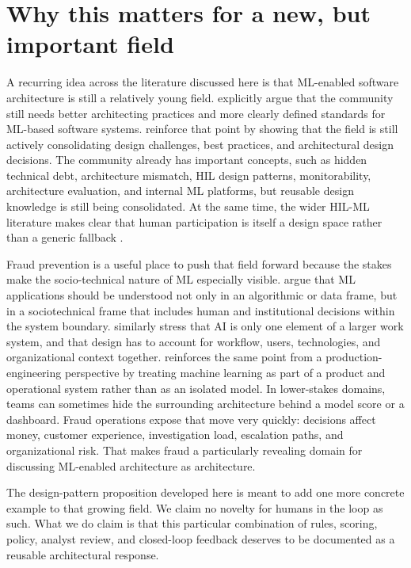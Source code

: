 \documentclass[11pt,a4paper]{article}
\begin{document}
\section{Why this matters for a new, but important field}

A recurring idea across the literature discussed here is that ML-enabled software architecture is still a relatively young field. \citet{Muccini2021} explicitly argue that the community still needs better architecting practices and more clearly defined standards for ML-based software systems. \citet{Nazir2024} reinforce that point by showing that the field is still actively consolidating design challenges, best practices, and architectural design decisions. The community already has important concepts, such as hidden technical debt, architecture mismatch, HIL design patterns, monitorability, architecture evaluation, and internal ML platforms, but reusable design knowledge is still being consolidated. At the same time, the wider HIL-ML literature makes clear that human participation is itself a design space rather than a generic fallback \citep{MosqueiraRey2023, Andersen2024}.

Fraud prevention is a useful place to push that field forward because the stakes make the socio-technical nature of ML especially visible. \citet{Dobbe2024} argue that ML applications should be understood not only in an algorithmic or data frame, but in a sociotechnical frame that includes human and institutional decisions within the system boundary. \citet{Salwei2022} similarly stress that AI is only one element of a larger work system, and that design has to account for workflow, users, technologies, and organizational context together. \citet{Kaestner2025} reinforces the same point from a production-engineering perspective by treating machine learning as part of a product and operational system rather than as an isolated model. In lower-stakes domains, teams can sometimes hide the surrounding architecture behind a model score or a dashboard. Fraud operations expose that move very quickly: decisions affect money, customer experience, investigation load, escalation paths, and organizational risk. That makes fraud a particularly revealing domain for discussing ML-enabled architecture as architecture.

The design-pattern proposition developed here is meant to add one more concrete example to that growing field. We claim no novelty for humans in the loop as such. What we do claim is that this particular combination of rules, scoring, policy, analyst review, and closed-loop feedback deserves to be documented as a reusable architectural response.
\end{document}
